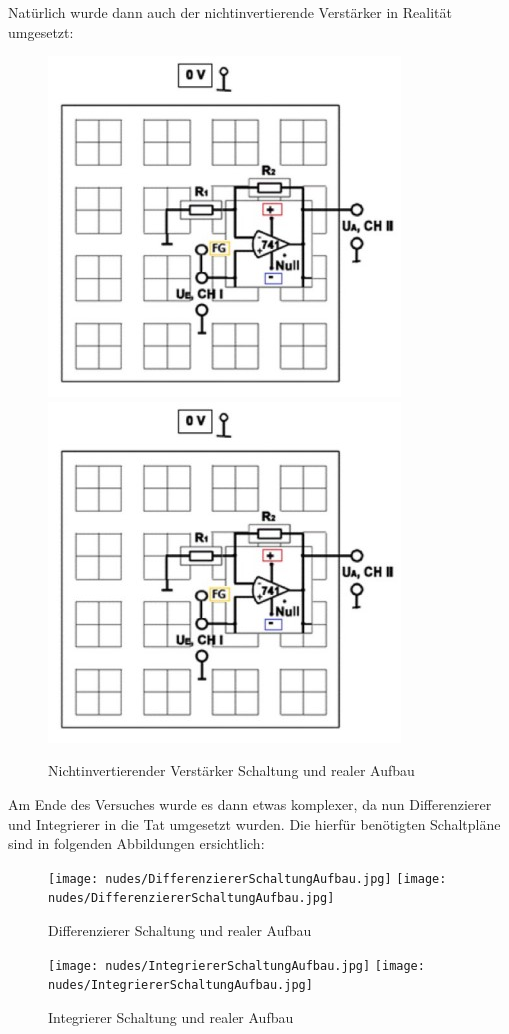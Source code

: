 \documentclass[12pt,a4paper,twoside]{article}
\begin{document}
\noindent
Natürlich wurde dann auch der nichtinvertierende Verstärker in Realität umgesetzt:

\begin{figure}[H]
    \centering
    \includegraphics[width=0.4\linewidth]{nudes/NichtInvertierenderVerstärkerSchaltungAufbau.jpg}
    \includegraphics[width=0.4\linewidth]{nudes/NichtInvertierenderVerstärkerSchaltungAufbau.jpg}
    \caption{Nichtinvertierender Verstärker Schaltung und realer Aufbau \cite{teachcenter2}}
    \label{fig:SchaltungNichtInvertierenderVerstärker}
\end{figure}

\noindent
Am Ende des Versuches wurde es dann etwas komplexer, da nun Differenzierer und Integrierer in die Tat umgesetzt wurden. Die hierfür benötigten Schaltpläne sind in folgenden Abbildungen ersichtlich: 

\begin{figure}[H]
    \centering
    \texttt{[image: nudes/DifferenziererSchaltungAufbau.jpg]}
    \texttt{[image: nudes/DifferenziererSchaltungAufbau.jpg]}
    \caption{Differenzierer Schaltung und realer Aufbau \cite{teachcenter2}}
    \label{fig:SchaltungDifferenzierer}
\end{figure}

\begin{figure}[H]
    \centering
    \texttt{[image: nudes/IntegriererSchaltungAufbau.jpg]}
    \texttt{[image: nudes/IntegriererSchaltungAufbau.jpg]}
    \caption{Integrierer Schaltung und realer Aufbau \cite{teachcenter2}}
    \label{fig:SchaltungIntegrierer}
\end{figure}
\end{document}
